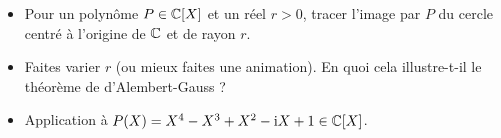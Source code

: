 \begin{frame}
\begin{tp}
\begin{itemize}
  \item Pour un polynôme $P \in \mathbb{C}[X]$ et un réel $r>0$, tracer l'image par $P$ du cercle centré à l'origine de $\mathbb{C}$ et de rayon $r$.\pause

  
  \item 
	  Faites varier $r$ (ou mieux faites une animation). 
  En quoi cela illustre-t-il le théorème de d'Alembert-Gauss ?\pause


  
  \item Application à $P(X) = X^4-X^3+X^2-\mathrm{i} X+1 \in \mathbb{C}[X]$.
\end{itemize}
\end{tp}
\end{frame}

